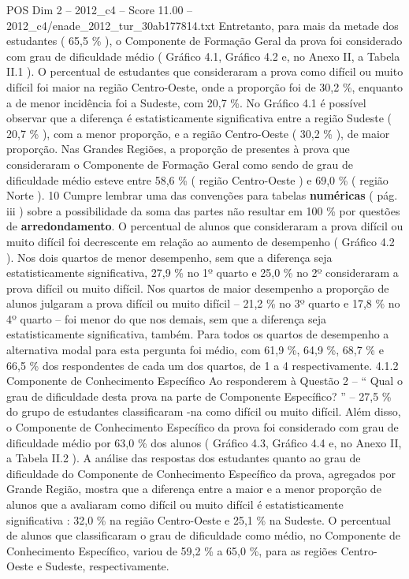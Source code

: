 \begin{textsample}{POS Dim 2 – 2012\_c4 – Score 11.00 – 2012\_c4/enade\_2012\_tur\_30ab177814.txt}
Entretanto, para mais da metade dos estudantes ( 65,5 \% ), o Componente de Formação Geral da prova foi considerado com grau de dificuldade médio ( Gráfico 4.1, Gráfico 4.2 e, no Anexo II, a Tabela II.1 ).
O percentual de estudantes que consideraram a prova como difícil ou muito difícil foi maior na região Centro-Oeste, onde a proporção foi de 30,2 \%, enquanto a de menor incidência foi a Sudeste, com 20,7 \%.
No Gráfico 4.1 é possível observar que a diferença é estatisticamente significativa entre a região Sudeste ( 20,7 \% ), com a menor proporção, e a região Centro-Oeste ( 30,2 \% ), de maior proporção.
Nas Grandes Regiões, a proporção de presentes à prova que consideraram o Componente de Formação Geral como sendo de grau de dificuldade médio esteve entre 58,6 \% ( região Centro-Oeste ) e 69,0 \% ( região Norte ). 10 Cumpre lembrar uma das convenções para tabelas \textbf{numéricas} ( pág. iii ) sobre a possibilidade da soma das partes não resultar em 100 \% por questões de \textbf{arredondamento}.
O percentual de alunos que consideraram a prova difícil ou muito difícil foi decrescente em relação ao aumento de desempenho ( Gráfico 4.2 ).
Nos dois quartos de menor desempenho, sem que a diferença seja estatisticamente significativa, 27,9 \% no 1º quarto e 25,0 \% no 2º consideraram a prova difícil ou muito difícil.
Nos quartos de maior desempenho a proporção de alunos julgaram a prova difícil ou muito difícil – 21,2 \% no 3º quarto e 17,8 \% no 4º quarto – foi menor do que nos demais, sem que a diferença seja estatisticamente significativa, também.
Para todos os quartos de desempenho a alternativa modal para esta pergunta foi médio, com 61,9 \%, 64,9 \%, 68,7 \% e 66,5 \% dos respondentes de cada um dos quartos, de 1 a 4 respectivamente. 4.1.2 Componente de Conhecimento Específico Ao responderem à Questão 2 – “ Qual o grau de dificuldade desta prova na parte de Componente Específico? ” – 27,5 \% do grupo de estudantes classificaram -na como difícil ou muito difícil.
Além disso, o Componente de Conhecimento Específico da prova foi considerado com grau de dificuldade médio por 63,0 \% dos alunos ( Gráfico 4.3, Gráfico 4.4 e, no Anexo II, a Tabela II.2 ).
A análise das respostas dos estudantes quanto ao grau de dificuldade do Componente de Conhecimento Específico da prova, agregados por Grande Região, mostra que a diferença entre a maior e a menor proporção de alunos que a avaliaram como difícil ou muito difícil é estatisticamente significativa : 32,0 \% na região Centro-Oeste e 25,1 \% na Sudeste.
O percentual de alunos que classificaram o grau de dificuldade como médio, no Componente de Conhecimento Específico, variou de 59,2 \% a 65,0 \%, para as regiões Centro-Oeste e Sudeste, respectivamente.

\end{textsample}
